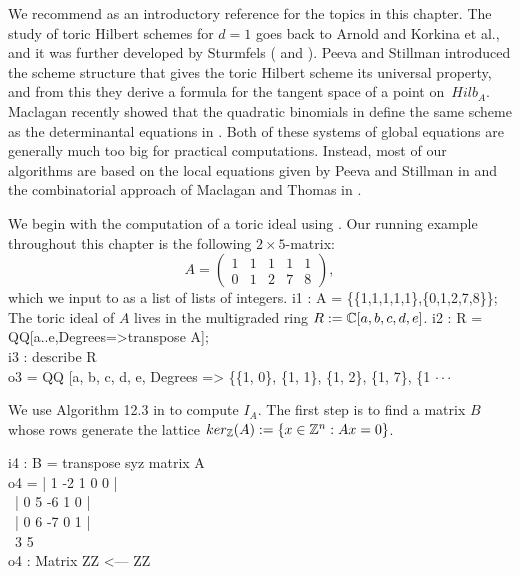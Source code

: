 We recommend \cite[\S 4, \S 10]{HS:St2} as an introductory reference for the 
topics in this chapter.
The study of toric Hilbert schemes for $d=1$ goes back to
Arnold \cite{HS:Arn} and Korkina et al.\cite{HS:KPR}, and it was
further developed by Sturmfels  (\cite{HS:St1} and \cite[\S 10]{HS:St2}). 
Peeva and Stillman \cite{HS:PS1} introduced the scheme structure 
that gives the toric Hilbert scheme its universal property,
and from this they derive a formula for the tangent space
of a point on  $\, Hilb_A $. Maclagan recently showed that the 
quadratic binomials in \cite[\S 5]{HS:St1} define the same scheme as the
determinantal equations in \cite{HS:PS1}.
Both of these systems of global equations are 
generally much too big for 
practical computations. Instead, most of our algorithms are based on
the local equations given by Peeva and Stillman in \cite{HS:PS2}
and the combinatorial approach of Maclagan and Thomas in \cite{HS:MT}.

We begin with the computation of a toric ideal using \Mtwo. Our
running example throughout this chapter is the following $2 \times
5$-matrix:
\begin{equation}
\label{OurMatrix}
A = \left( \begin{matrix}
           1 & 1 & 1 & 1 & 1  \\ 
           0 & 1 & 2 & 7 & 8 
\end{matrix} \right),
\end{equation}
which we input to \Mtwo as a list of lists of 
integers.
\beginOutput
i1 : A = \{\{1,1,1,1,1\},\{0,1,2,7,8\}\}; \\
\endOutput
The toric ideal of $A$ lives in the multigraded ring $R := \mathbb{C} [a,b,c,d,e]$.
\beginOutput
i2 : R = QQ[a..e,Degrees=>transpose A]; \\
\endOutput
\beginOutput
i3 : describe R \\
\emptyLine
o3 = QQ [a, b, c, d, e, Degrees => \{\{1, 0\}, \{1, 1\}, \{1, 2\}, \{1, 7\}, \{1 $\cdot\cdot\cdot$\\
\endOutput

We use Algorithm 12.3 in \cite{HS:St2} to compute $I_A$. The first step is
to find a matrix $B$ whose rows generate the lattice $ker_{\mathbb{Z}}(A)
:= \{x \in \mathbb{Z}^n : Ax = 0 \}$. 

\beginOutput
i4 : B = transpose syz matrix A \\
\emptyLine
o4 = | 1 -2 1  0 0 |\\
\     | 0 5  -6 1 0 |\\
\     | 0 6  -7 0 1 |\\
\emptyLine
\              3        5\\
o4 : Matrix ZZ  <--- ZZ\\
\endOutput

